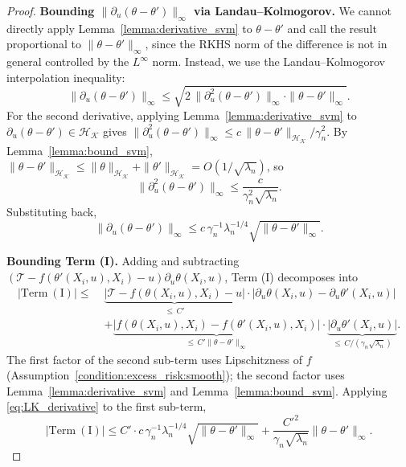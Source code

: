 \documentclass[12pt]{article}
\begin{document}
\begin{proof}
\noindent\textbf{Bounding $\|\partial_u(\theta-\theta')\|_\infty$ via Landau–Kolmogorov.}
We cannot directly apply Lemma~\ref{lemma:derivative_svm} to $\theta-\theta'$ and call the result proportional to $\|\theta-\theta'\|_\infty$, since the RKHS norm of the difference is not in general controlled by the $L^\infty$ norm.  Instead, we use the Landau–Kolmogorov interpolation inequality:
$$\|\partial_u(\theta-\theta')\|_\infty \leq \sqrt{2\,\|\partial^2_u(\theta-\theta')\|_\infty\cdot\|\theta-\theta'\|_\infty}.$$
For the second derivative, applying Lemma~\ref{lemma:derivative_svm} to $\partial_u(\theta-\theta') \in \mathcal{H}_\mathcal{K}$ gives $\|\partial^2_u(\theta-\theta')\|_\infty \leq c\,\|\theta-\theta'\|_{\mathcal{H}_\mathcal{K}}/\gamma_n^2$.  By Lemma~\ref{lemma:bound_svm}, $\|\theta-\theta'\|_{\mathcal{H}_\mathcal{K}} \leq \|\theta\|_{\mathcal{H}_\mathcal{K}}+\|\theta'\|_{\mathcal{H}_\mathcal{K}} = O(1/\sqrt{\lambda_n})$, so
$$\|\partial^2_u(\theta-\theta')\|_\infty \leq \frac{c}{\gamma_n^2\sqrt{\lambda_n}}.$$
Substituting back,
\begin{equation}\label{eq:LK_derivative}
\|\partial_u(\theta-\theta')\|_\infty \leq c\,\gamma_n^{-1}\lambda_n^{-1/4}\sqrt{\|\theta-\theta'\|_\infty}.
\end{equation}

\noindent\textbf{Bounding Term (I).}
Adding and subtracting $(\mathcal{T}-f(\theta'(X_i,u),X_i)-u)\partial_u\theta(X_i,u)$, Term (I) decomposes into
\begin{align*}
|\mathrm{Term\ (I)}| \leq\;& \underbrace{\left|\mathcal{T}-f(\theta(X_i,u),X_i)-u\right|}_{\leq\,C'}\cdot\left|\partial_u\theta(X_i,u) - \partial_u\theta'(X_i,u)\right|\\
&+ \underbrace{\left|f(\theta(X_i,u),X_i) - f(\theta'(X_i,u),X_i)\right|}_{\leq\,C'\|\theta-\theta'\|_\infty}\cdot\underbrace{\left|\partial_u\theta'(X_i,u)\right|}_{\leq\,C/(\gamma_n\sqrt{\lambda_n})}.
\end{align*}
The first factor of the second sub-term uses Lipschitzness of $f$ (Assumption~\ref{condition:excess_risk:smooth}); the second factor uses Lemma~\ref{lemma:derivative_svm} and Lemma~\ref{lemma:bound_svm}.  Applying \eqref{eq:LK_derivative} to the first sub-term,
$$|\mathrm{Term\ (I)}| \leq C'\cdot c\,\gamma_n^{-1}\lambda_n^{-1/4}\sqrt{\|\theta-\theta'\|_\infty} + \frac{C'^2}{\gamma_n\sqrt{\lambda_n}}\|\theta-\theta'\|_\infty.$$


\end{proof}
\end{document}
